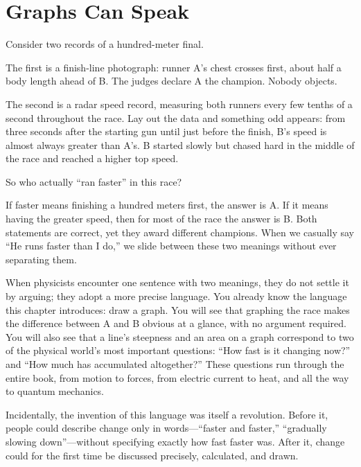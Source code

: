 \chapter{Graphs Can Speak}


Consider two records of a hundred-meter final.

The first is a finish-line photograph: runner A's chest crosses first, about half a body length ahead of B. The judges declare A the champion. Nobody objects.

The second is a radar speed record, measuring both runners every few tenths of a second throughout the race. Lay out the data and something odd appears: from three seconds after the starting gun until just before the finish, B's speed is almost always greater than A's. B started slowly but chased hard in the middle of the race and reached a higher top speed.

So who actually ``ran faster'' in this race?

If faster means finishing a hundred meters first, the answer is A. If it means having the greater speed, then for most of the race the answer is B. Both statements are correct, yet they award different champions. When we casually say ``He runs faster than I do,'' we slide between these two meanings without ever separating them.

When physicists encounter one sentence with two meanings, they do not settle it by arguing; they adopt a more precise language. You already know the language this chapter introduces: draw a graph. You will see that graphing the race makes the difference between A and B obvious at a glance, with no argument required. You will also see that a line's steepness and an area on a graph correspond to two of the physical world's most important questions: ``How fast is it changing now?'' and ``How much has accumulated altogether?'' These questions run through the entire book, from motion to forces, from electric current to heat, and all the way to quantum mechanics.

Incidentally, the invention of this language was itself a revolution. Before it, people could describe change only in words---``faster and faster,'' ``gradually slowing down''---without specifying exactly how fast faster was. After it, change could for the first time be discussed precisely, calculated, and drawn.


